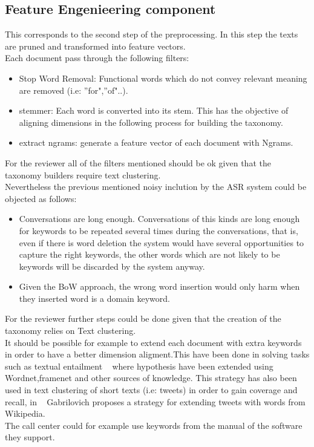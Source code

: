 \documentclass[4pt,a4paper,twocolumn]{article}
\begin{document}
\subsection{Feature Engenieering component}
This corresponds to the second step of the preprocessing. In this step the texts are pruned and transformed into feature vectors.\\
Each document pass through the following filters:

\begin{itemize}
	\item Stop Word Removal: Functional words which do not convey relevant meaning are removed (i.e: ''for",''of"..).
	
	\item stemmer: Each word is converted into its stem. This has the objective of aligning dimensions in the following process for building the taxonomy.
	
	\item extract ngrams:  generate a feature vector of each document with Ngrams.
\end{itemize}

For the reviewer all of the filters mentioned should be ok given that the taxonomy builders require text clustering.\\
Nevertheless the previous mentioned noisy inclution by the ASR system could be objected as follows:

\begin{itemize}
	\item Conversations are long enough. Conversations of this kinds are long enough for keywords to be repeated several times during the conversations, that is, even if there is word deletion the system would have several opportunities to capture the right keywords, the other words which are not likely to be keywords will be discarded by the system anyway.

  \item Given the BoW approach, the wrong word insertion would only harm when they inserted word is a domain keyword.
  
\end{itemize}

For the reviewer further steps could be done given that the creation of the taxonomy relies on Text clustering.\\
It should be possible for example to extend each document with extra keywords in order to have a better dimension aligment.This have been done in solving tasks such as  textual entailment ~\cite{Mirkin:2009:EIU:1609067.1609129} where hypothesis have been extended using Wordnet,framenet and other sources of knowledge. This strategy has also been used in text clustering of short texts (i.e: tweets)  in order to gain coverage and recall, in ~\cite{Gabrilovich:2006:OBB:1597348.1597395} Gabrilovich proposes a strategy for extending tweets with words from Wikipedia.\\
The call center could for example use keywords from the manual of the software they support.
\end{document}
